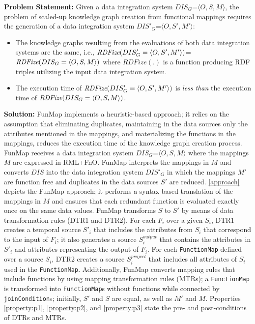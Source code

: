 \noindent\textbf{Problem Statement:} 
Given a data integration system $DIS_G$=$\langle O,S,M\rangle$, the problem of scaled-up knowledge graph creation from functional mappings requires the generation of a data integration system 
$DIS'_G$=$\langle O,S',M' \rangle$:
\begin{itemize}
\renewcommand{\labelitemi}{$\bullet$}
\item The knowledge graphs resulting from the evaluations of both data integration systems are the same, i.e., $\emph{RDFize}(DIS'_G = \langle O,S',M' \rangle)$=$\emph{RDFize}(DIS_G = \langle O,S,M \rangle)$ where $RDFize(.)$ is a function producing RDF triples utilizing the input data integration system.
\item The execution time of $\emph{RDFize}(DIS'_G=\langle O,S',M' \rangle)$ is \emph{less than} the execution time of $\emph{RDFize}(DIS_G=\langle O,S,M \rangle)$.
\end{itemize}

\noindent \textbf{Solution:} FunMap implements a heuristic-based approach; it relies on the assumption that eliminating duplicates, maintaining in the data sources only the attributes mentioned in the mappings, and materializing the functions in the mappings, reduces the execution time of the knowledge graph creation process. 
FunMap receives a data integration system $DIS_G$=$\langle O,S,M \rangle$ where the mappings $M$ are expressed in RML+FnO. FunMap interprets the mappings in $M$ and converts $DIS$ into the data integration system $DIS'_G$ in which the mappings $M'$ are function free and duplicates in the data sources $S'$ are reduced. \autoref{approach} depicts the FunMap approach; it performs a syntax-based translation of the mappings in $M$ and ensures that each redundant function is evaluated exactly once on the same data values. 
FunMap transforms $S$ to $S'$ by means of data transformation rules (DTR1 and DTR2). For each $F_i$ over a given $S_i$, DTR1 creates a temporal source $S'_i$ that includes the attributes from $S_i$ that correspond to the input of $F_i$; it also generates a source $S_i^{output}$ that contains the attributes in $S'_i$ and attributes representing the output of $F_i$. For each \verb|FunctionMap| defined over a source $S_i$, DTR2 creates a source $S_i^{project}$ that includes all attributes of $S_i$ used in the \verb|FunctionMap|. Additionally, FunMap converts mapping rules that include functions by using mapping transformation rules (MTRs); a \verb|FunctionMap| is transformed into \verb|FunctionMap|s without functions while connected by \verb|joinCondition|s; initially, $S'$ and $S$ are equal, as well as $M'$ and $M$. Properties \ref{property:p1}, \ref{property:p2}, and \ref{property:p3} state the pre- and post-conditions of DTRs and MTRs.


